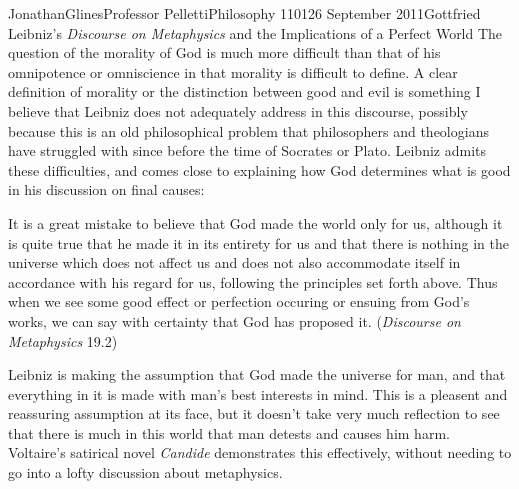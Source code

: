 \documentclass[12pt,letterpaper]{article}
\begin{document}
\begin{mla}{Jonathan}{Glines}{Professor Pelletti}{Philosophy 1101}{26 September 2011}{Gottfried Leibniz's \textit{Discourse on Metaphysics} and the Implications of a Perfect World}
The question of the morality of God is much more difficult than that of his omnipotence or omniscience in that morality is difficult to define. A clear definition of morality or the distinction between good and evil is something I believe that Leibniz does not adequately address in this discourse, possibly because this is an old philosophical problem that philosophers and theologians have struggled with since before the time of Socrates or Plato. Leibniz admits these difficulties, and comes close to explaining how God determines what is good in his discussion on final causes:
\begin{mlaquote}
It is a great mistake to believe that God made the world only for us, although it is quite true that he made it in its entirety for us and that there is nothing in the universe which does not affect us and does not also accommodate itself in accordance with his regard for us, following the principles set forth above. Thus when we see some good effect or perfection occuring or ensuing from God's works, we can say with certainty that God has proposed it. (\textit{Discourse on Metaphysics} 19.2)
\end{mlaquote}
Leibniz is making the assumption that God made the universe for man, and that everything in it is made with man's best interests in mind. This is a pleasent and reassuring assumption at its face, but it doesn't take very much reflection to see that there is much in this world that man detests and causes him harm. Voltaire's satirical novel \textit{Candide} demonstrates this effectively, without needing to go into a lofty discussion about metaphysics.


\end{mla}
\end{document}
